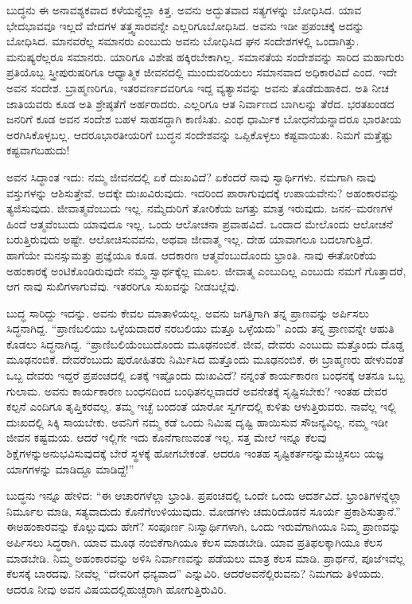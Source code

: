 ಬುದ್ಧನು ಈ ಅನಾವಶ್ಯಕವಾದ ಕಳೆಯನ್ನೆಲ್ಲಾ ಕಿತ್ತ. ಅವನು ಅದ್ಭುತವಾದ ಸತ್ಯಗಳನ್ನು ಬೋಧಿಸಿದ. ಯಾವ ಭೇದಭಾವವೂ ಇಲ್ಲದೆ ವೇದಗಳ ತತ್ತ್ವಸಾರವನ್ನೇ ಎಲ್ಲರಿಗೂ\break ಬೋಧಿಸಿದ. ಅವನು ಇಡೀ ಪ್ರಪಂಚಕ್ಕೆ ಅದನ್ನು ಬೋಧಿಸಿದ. ಮಾನವರೆಲ್ಲ ಸಮಾನರು ಎಂಬುದು ಅವನು ಬೋಧಿಸಿದ ಘನ ಸಂದೇಶಗಳಲ್ಲಿ ಒಂದಾಗಿತ್ತು. ಮನುಷ್ಯರೆಲ್ಲರೂ ಸಮಾನರು. ಯಾರಿಗೂ ವಿಶೇಷ ಹಕ್ಕಿರಬೇಕಾಗಿಲ್ಲ. ಸಮಾನತೆಯ ಸಂದೇಶವನ್ನು ಸಾರಿದ ಮಹಾಗುರು ಪ್ರತಿಯೊಬ್ಬ ಸ್ತ್ರೀಪುರುಷರಿಗೂ ಆಧ್ಯಾತ್ಮಿಕ ಜೀವನದಲ್ಲಿ ಮುಂದುವರಿಯಲು ಸಮಾನವಾದ ಅಧಿಕಾರವಿದೆ ಎಂದ. ಇದೇ ಅವನ ಸಂದೇಶ. ಬ್ರಾಹ್ಮಣರಿಗೂ, ಇತರ\break ವರ್ಣದವರಿಗೂ ಇದ್ದ ವ್ಯತ್ಯಾಸವನ್ನು ಅವನು ತೊಡೆದುಹಾಕಿದ. ಅತಿ ನೀಚ ಜಾತಿ\-ಯವರು ಕೂಡ ಅತಿ ಶ್ರೇಷ್ಠತೆಗೆ ಅರ್ಹರಾದರು. ಎಲ್ಲರಿಗೂ ಆತ ನಿರ್ವಾಣದ ಬಾಗಿಲನ್ನು ತೆರೆದ. ಭರತಖಂಡದ ಜನರಿಗೆ ಕೂಡ ಅವನ ಸಂದೇಶ ಬಹಳ ಸಾಹಸದ್ದಾಗಿ ಕಾಣಿಸಿತು. ಎಂಥ ಧಾರ್ಮಿಕ ಬೋಧನೆಯನ್ನಾದರೂ ಭಾರತೀಯ ಅರಗಿಸಿಕೊಳ್ಳಬಲ್ಲ. ಆದರೂ\break ಭಾರತೀಯರಿಗೆ ಬುದ್ಧನ ಸಂದೇಶವನ್ನು ಒಪ್ಪಿಕೊಳ್ಳಲು ಕಷ್ಟವಾಯಿತು. ನಿಮಗೆ ಮತ್ತೆಷ್ಟು ಕಷ್ಟವಾಗಬಹುದು!

ಅವನ ಸಿದ್ಧಾಂತ ಇದು: ನಮ್ಮ ಜೀವನದಲ್ಲಿ ಏಕೆ ದುಃಖವಿದೆ? ಏಕೆಂದರೆ ನಾವು ಸ್ವಾರ್ಥಿಗಳು. ನಮಗಾಗಿ ನಾವು ವಸ್ತುಗಳನ್ನು ಆಶಿಸುತ್ತೇವೆ. ಅದಕ್ಕೇ ದುಃಖವಿರುವುದು. ಇದರಿಂದ ಪಾರಾಗುವುದಕ್ಕೆ ಉಪಾಯವೇನು? ಅಹಂಕಾರವನ್ನು ತ್ಯಜಿಸುವುದು. ಜೀವಾತ್ಮವೆಂಬುದು ಇಲ್ಲ. ನಮ್ಮೆದುರಿಗೆ ತೋರಿಕೆಯ ಜಗತ್ತು ಮಾತ್ರ ಇರುವುದು. ಜನನ–ಮರಣಗಳ ಹಿಂದೆ ಆತ್ಮವೆಂಬುದು ಯಾವುದೂ ಇಲ್ಲ. ಒಂದು ಆಲೋಚನಾ ಪ್ರವಾಹವಿದೆ. ಒಂದಾದ ಮೇಲೊಂದು ಆಲೋಚನೆ ಬರುತ್ತಿರುವುದು ಅಷ್ಟೇ. ಆಲೋಚಿಸುವವನು, ಅಥವಾ ಜೀವಾತ್ಮ ಇಲ್ಲ. ದೇಹ ಯಾವಾಗಲೂ ಬದಲಾಗುತ್ತಿದೆ. ಹಾಗೆಯೇ ಮನಸ್ಸು\break ಮತ್ತು ಪ್ರಜ್ಞೆಯೂ ಕೂಡ. ಆದಕಾರಣ ಆತ್ಮವೆಂಬುದೊಂದು ಭ್ರಾಂತಿ. ನಾವು ಈ\break ತೋರಿಕೆಯ ಅಹಂಕಾರಕ್ಕೆ ಅಂಟಿಕೊಂಡಿರುವುದೇ ನಮ್ಮ ಸ್ವಾರ್ಥಕ್ಕೆಲ್ಲ ಮೂಲ. ಜೀವಾತ್ಮ ಎಂಬುದಿಲ್ಲ ಎಂಬುದು ನಮಗೆ ಗೊತ್ತಾದರೆ, ಆಗ ನಾವು ಸುಖಿಗಳಾಗುವೆವು. ಇತರರಿಗೂ ಸುಖವನ್ನು ನೀಡಬಲ್ಲೆವು.

ಬುದ್ಧ ಸಾರಿದ್ದು ಇದನ್ನು. ಅವನು ಕೇವಲ ಮಾತಾಳಿಯಲ್ಲ. ಅವನು ಜಗತ್ತಿಗಾಗಿ ತನ್ನ ಪ್ರಾಣವನ್ನು ಅರ್ಪಿಸಲು ಸಿದ್ಧನಾಗಿದ್ದ. “ಪ್ರಾಣಿಬಲಿಯು ಒಳ್ಳೆಯದಾದರೆ ನರಬಲಿಯು ಮತ್ತೂ ಒಳ್ಳೆಯದು” ಎಂದು ತನ್ನ ಪ್ರಾಣವನ್ನೇ ಆಹುತಿ ಕೊಡಲು ಸಿದ್ಧನಾಗಿದ್ದ. “ಪ್ರಾಣಿಬಲಿಯೆಂಬುದೊಂದು ಮೂಢನಂಬಿಕೆ. ಜೀವ, ದೇವರು ಎಂಬುದು ಮತ್ತೊಂದು ದೊಡ್ಡ ಮೂಢನಂಬಿಕೆ. ದೇವರೆಂಬುದು ಪುರೋಹಿತರು ನಿರ್ಮಿಸಿದ ಮತ್ತೊಂದು ಮೂಢನಂಬಿಕೆ. ಈ ಬ್ರಾಹ್ಮಣರು ಹೇಳುವಂತೆ ಒಬ್ಬ ದೇವರು ಇದ್ದರೆ ಪ್ರಪಂಚದಲ್ಲಿ ಏತಕ್ಕೆ ಇಷ್ಟೊಂದು ದುಃಖವಿದೆ? ನನ್ನಂತೆ ಕಾರ್ಯಕಾರಣ ಬಂಧನಕ್ಕೆ ಆತನೂ ಒಬ್ಬ ಗುಲಾಮ. ಅವನು ಕಾರ್ಯಕಾರಣ ಬಂಧನದಿಂದ ಬಂಧಿತನಲ್ಲವಾದರೆ ಅವನೇತಕ್ಕೆ ಸೃಷ್ಟಿಸಬೇಕು? ಇಂತಹ ದೇವರ ಕಲ್ಪನೆ ಎಂದಿಗೂ ತೃಪ್ತಿಕರವಲ್ಲ. ತಮ್ಮ ಇಚ್ಛೆ ಬಂದಂತೆ ಯಾರೋ ಸ್ವರ್ಗದಲ್ಲಿ ಕುಳಿತು ಆಳುತ್ತಿರುವರು. ನಾವೆಲ್ಲ ಇಲ್ಲಿ ದುಃಖದಲ್ಲಿ ಸಿಕ್ಕಿ ಸಾಯಬೇಕು. ಅವನಿಗೆ ನಮ್ಮ ಕಡೆ ಒಂದು ನಿಮಿಷ ದೃಷ್ಟಿ ಹಾಯಿಸುವ ಸೌಜನ್ಯವಿಲ್ಲ. ನಮ್ಮ ಇಡೀ ಜೀವನ ಕಷ್ಟಮಯ. ಆದರೆ ಇಲ್ಲಿಗೇ ಇದು ಕೊನೆಗಾಣುವಂತೆ ಇಲ್ಲ. ಸತ್ತ ಮೇಲೆ ಇನ್ನೂ ಕೆಲವು ಶಿಕ್ಷೆಗಳನ್ನು\break ಅನುಭವಿಸುವುದಕ್ಕೆ ಬೇರೆ ಸ್ಥಳಕ್ಕೆ ಹೋಗಬೇಕಂತೆ. ಆದರೂ ಇಂತಹ ಸೃಷ್ಟಿಕರ್ತನನ್ನು\break ಮೆಚ್ಚಿಸಲು ಯಜ್ಞ ಯಾಗಗಳನ್ನು ಮಾಡಿದ್ದೂ ಮಾಡಿದ್ದೆ!”

ಬುದ್ಧನು ಇನ್ನೂ ಹೇಳಿದ: “ಈ ಆಚಾರಗಳೆಲ್ಲಾ ಭ್ರಾಂತಿ. ಪ್ರಪಂಚದಲ್ಲಿ ಒಂದೇ ಒಂದು ಆದರ್ಶವಿದೆ. ಭ್ರಾಂತಿಗಳನ್ನೆಲ್ಲಾ ನಿರ್ಮೂಲ ಮಾಡಿ, ಸತ್ಯವಾದುದು ಕೊನೆಗೆ\break ಉಳಿಯುವುದು. ಮೋಡಗಳು ಚದುರಿದೊಡನೆ ಸೂರ್ಯ ಪ್ರಕಾಶಿಸುತ್ತಾನೆ.” ಈ\break ಅಹಂಕಾರವನ್ನು ಕೊಲ್ಲುವುದು ಹೇಗೆ? ಸಂಪೂರ್ಣ ನಿಃಸ್ವಾರ್ಥಿಗಳಾಗಿ, ಒಂದು ಇರುವೆಗಾಗಿಯೂ ನಿಮ್ಮ ಪ್ರಾಣವನ್ನು ಅರ್ಪಿಸಲು ಸಿದ್ಧರಾಗಿ. ಯಾವ ಮೂಢ ನಂಬಿಕೆಗಾಗಿಯೂ ಕೆಲಸ ಮಾಡಬೇಡಿ. ಯಾವ ಪ್ರತಿಫಲಕ್ಕಾಗಿಯೂ ಕೆಲಸ ಮಾಡಬೇಡಿ. ನಿಮ್ಮ ಅಹಂಕಾರವನ್ನು ಅಳಿಸಿ ನಿರ್ವಾಣವನ್ನು ಪಡೆಯಲು ಮಾತ್ರ ಕೆಲಸ ಮಾಡಿ. ಪ್ರಾರ್ಥನೆ, ಪೂಜೆ\break ಇವೆಲ್ಲ ಕೆಲಸಕ್ಕೆ ಬಾರದವು. ನೀವೆಲ್ಲ “ದೇವರಿಗೆ ಧನ್ಯವಾದ” ಎನ್ನುವಿರಿ. ಆದರೆ\break ಅವನೆಲ್ಲಿರುವನು? ನಿಮಗದು ತಿಳಿಯದು. ಆದರೂ ನೀವು ಅವನ ವಿಷಯದಲ್ಲಿ\break ಹುಚ್ಚರಾಗಿ ಹೋಗುತ್ತಿರುವಿರಿ.

